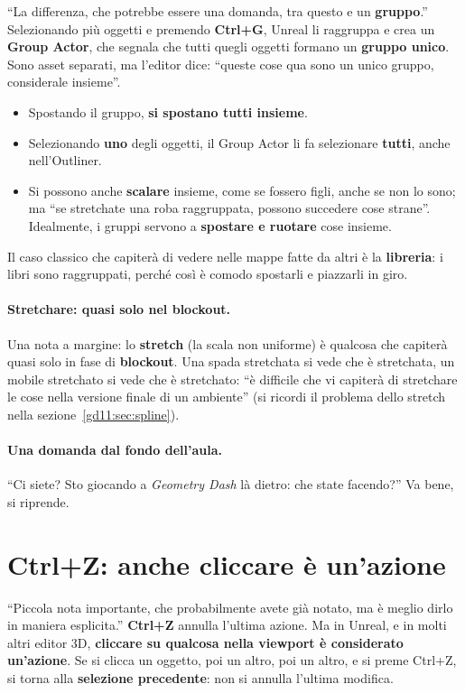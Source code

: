 ``La differenza, che potrebbe essere una domanda, tra questo e un
\textbf{gruppo}.'' Selezionando più oggetti e premendo \textbf{Ctrl+G}, Unreal
li raggruppa e crea un \textbf{Group Actor}, che segnala che tutti quegli
oggetti formano un \textbf{gruppo unico}. Sono asset separati, ma l'editor dice:
``queste cose qua sono un unico gruppo, considerale insieme''.
\begin{itemize}
  \item Spostando il gruppo, \textbf{si spostano tutti insieme}.
  \item Selezionando \textbf{uno} degli oggetti, il Group Actor li fa
        selezionare \textbf{tutti}, anche nell'Outliner.
  \item Si possono anche \textbf{scalare} insieme, come se fossero figli, anche
        se non lo sono; ma ``se stretchate una roba raggruppata, possono
        succedere cose strane''. Idealmente, i gruppi servono a
        \textbf{spostare e ruotare} cose insieme.
\end{itemize}
Il caso classico che capiterà di vedere nelle mappe fatte da altri è la
\textbf{libreria}: i libri sono raggruppati, perché così è comodo spostarli e
piazzarli in giro.

\paragraph{Stretchare: quasi solo nel blockout.} Una nota a margine: lo
\textbf{stretch} (la scala non uniforme) è qualcosa che capiterà quasi solo in
fase di \textbf{blockout}. Una spada stretchata si vede che è stretchata, un
mobile stretchato si vede che è stretchato: ``è difficile che vi capiterà di
stretchare le cose nella versione finale di un ambiente'' (si ricordi il
problema dello stretch nella sezione~\ref{gd11:sec:spline}).

\paragraph{Una domanda dal fondo dell'aula.} ``Ci siete? Sto giocando a
\emph{Geometry Dash} là dietro: che state facendo?'' Va bene, si riprende.

\section{Ctrl+Z: anche cliccare è un'azione}
\label{gd11:sec:ctrlz}

``Piccola nota importante, che probabilmente avete già notato, ma è meglio
dirlo in maniera esplicita.'' \textbf{Ctrl+Z} annulla l'ultima azione. Ma in
Unreal, e in molti altri editor 3D, \textbf{cliccare su qualcosa nella viewport
è considerato un'azione}. Se si clicca un oggetto, poi un altro, poi un altro, e
si preme Ctrl+Z, si torna alla \textbf{selezione precedente}: non si annulla
l'ultima modifica.

